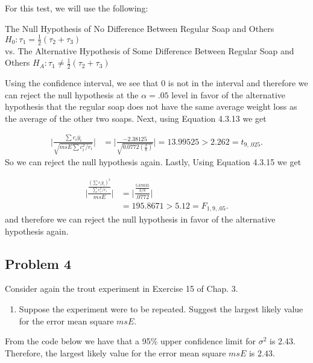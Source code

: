 \documentclass[12pt,]{article}
\providecommand{\tightlist}{%
  \setlength{\itemsep}{0pt}\setlength{\parskip}{0pt}}
\begin{document}
For this test, we will use the following:

\begin{center}
 The Null Hypothesis of No Difference Between Regular Soap and Others  $H_0 : \tau_1 = \frac{1}{2}(\tau_2+ \tau_3)$ \\
 vs. The Alternative Hypothesis of Some Difference Between Regular Soap and Others $H_A : \tau_1 \neq \frac{1}{2}(\tau_2+ \tau_3)$
\end{center}

Using the confidence interval, we see that 0 is not in the interval and
therefore we can reject the null hypothesis at the \(\alpha=.05\) level
in favor of the alternative hypothesis that the regular soap does not
have the same average weight loss as the average of the other two soaps.
Next, using Equation 4.3.13 we get

\[
 \begin{aligned}
 \Bigg| \frac{\sum c_i \bar{y}_i}{\sqrt{msE \sum c_i^2/r_i}}  \Bigg|
 &=  \Bigg| \frac{-2.38125}{\sqrt{0.0772 \left( \frac{3}{8} \right)}}  \Bigg| = 13.99525 > 2.262 = t_{9,.025}.
  \end{aligned}
 \] So we can reject the null hypothesis again. Lastly, Using Equation
4.3.15 we get

\[
 \begin{aligned}
 \Bigg| \frac{ \frac{\left(\sum c_i \bar{y}_i\right)^2}{\sum c_i^2/r_i} }{ msE }  \Bigg|
 &=   \Bigg| \frac{ \frac{5.67035 }{3/8} }{ .0772 }  \Bigg|\\
 &=195.8671 > 5.12 = F_{1,9,.05}.
  \end{aligned}
 \] and therefore we can reject the null hypothesis in favor of the
alternative hypothesis again.

\subsection{Problem 4}\label{problem-4}

Consider again the trout experiment in Exercise 15 of Chap. 3.

\begin{enumerate}
\def\labelenumi{(\alph{enumi})}
\tightlist
\item
  Suppose the experiment were to be repeated. Suggest the largest likely
  value for the error mean square \(msE\).
\end{enumerate}

From the code below we have that a 95\% upper confidence limit for
\(\sigma^2\) is 2.43. Therefore, the largest likely value for the error
mean square \(msE\) is \(2.43\).
\end{document}
